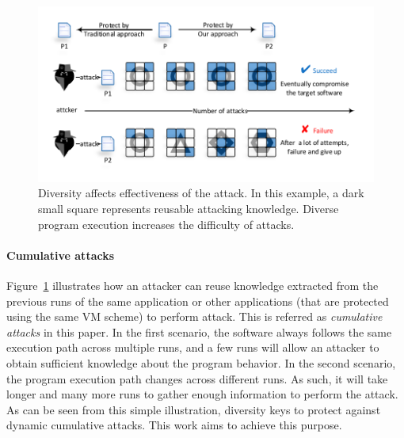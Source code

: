 \begin{figure}[t]%
    \centering
    \includegraphics[width=0.7\columnwidth]{figure/figone.pdf}
    \caption{Diversity affects effectiveness of the attack. In this example, a dark small square represents reusable attacking knowledge. Diverse program execution increases the difficulty of attacks.}\label{fig:Fig.1}
\end{figure}

\paragraph*{Cumulative attacks}
Figure~\ref{fig:Fig.1} illustrates how an attacker
can reuse knowledge extracted from the previous runs of the same application or
other applications (that are protected using the same VM scheme) to perform attack.
This is referred as \emph{cumulative attacks} in this paper.
In the first scenario, the software always follows the same execution path
across multiple runs, and a few runs will allow an attacker to
obtain sufficient knowledge about the program behavior.
In the second scenario, the program execution path changes across different runs.
As such, it will take longer and many more runs to gather enough information to perform the attack.
As can be seen from this simple illustration, diversity keys to protect against dynamic cumulative attacks.
This work aims to achieve this purpose.
